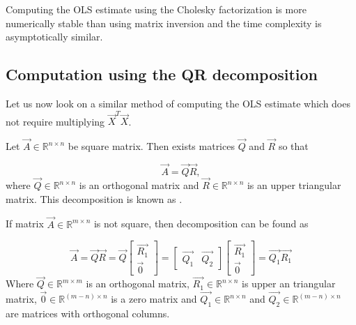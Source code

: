 Computing the OLS estimate using the Cholesky factorization is more numerically stable than using matrix inversion and the time complexity is asymptotically similar. 



\subsection{Computation using the QR decomposition}

Let us now look on a similar method of computing the OLS estimate which does not require multiplying $\vec{X}^T\vec{X}$. 


Let $\vec{A} \in \mathbb{R}^{n \times n}$ be square matrix. Then exists matrices $\vec{Q}$ and $\vec{R}$ so that 

\begin{equation}
    \vec{A} = \vec{Q}\vec{R},
\end{equation}
where $\vec{Q} \in \mathbb{R}^{n \times n}$ is an orthogonal matrix and $\vec{R} \in \mathbb{R}^{n \times n}$ is an upper triangular matrix. 
This decomposition is known as .

If matrix $\vec{A} \in \mathbb{R}^{m \times n}$ is not square, then decomposition can be found as

\begin{equation} \label{matrixq1r1}
    \vec{A} = \vec{Q}\vec{R} = \vec{Q} \begin{bmatrix}
        \vec{R_1} \\
        \vec{0}
    \end{bmatrix}
    =  \begin{bmatrix}
        \vec{Q_1} & \vec{Q_2}
    \end{bmatrix}  \begin{bmatrix}
        \vec{R_1} \\
        \vec{0}
    \end{bmatrix} 
    = \vec{Q_1} \vec{R_1}
\end{equation}
    Where $\vec{Q} \in \mathbb{R}^{m \times m}$ is an orthogonal matrix, $\vec{R_1} \in \mathbb{R}^{n \times n} $ is upper an triangular matrix, $\vec{0} \in \mathbb{R}^{ (m-n) \times n} $  is a zero matrix and $\vec{Q_1} \in \mathbb{R}^{n \times n}$  and $\vec{Q_2} \in \mathbb{R}^{(m-n) \times n}$ are matrices with orthogonal columns.
    
